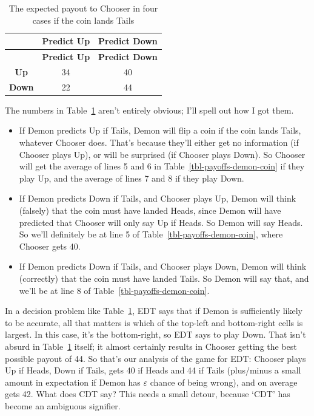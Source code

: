 \documentclass[
  10pt,
  letterpaper,
  DIV=11,
  numbers=noendperiod,
  twoside]{scrartcl}
\providecommand{\tightlist}{%
  \setlength{\itemsep}{0pt}\setlength{\parskip}{0pt}}\usepackage{longtable,booktabs,array}
\begin{document}
\begin{longtable}[]{@{}ccc@{}}
\caption{The expected payout to Chooser in four cases if the coin lands
Tails}\label{tbl-payout-if-tails}\tabularnewline
\toprule\noalign{}
& \textbf{Predict Up} & \textbf{Predict Down} \\
\midrule\noalign{}
\endfirsthead
\toprule\noalign{}
& \textbf{Predict Up} & \textbf{Predict Down} \\
\midrule\noalign{}
\endhead
\bottomrule\noalign{}
\endlastfoot
\textbf{Up} & 34 & 40 \\
\textbf{Down} & 22 & 44 \\
\end{longtable}

The numbers in Table~\ref{tbl-payout-if-tails} aren't entirely obvious;
I'll spell out how I got them.

\begin{itemize}
\tightlist
\item
  If Demon predicts Up if Tails, Demon will flip a coin if the coin
  lands Tails, whatever Chooser does. That's because they'll either get
  no information (if Chooser plays Up), or will be surprised (if Chooser
  plays Down). So Chooser will get the average of lines 5 and 6 in
  Table~\ref{tbl-payoffs-demon-coin} if they play Up, and the average of
  lines 7 and 8 if they play Down.
\item
  If Demon predicts Down if Tails, and Chooser plays Up, Demon will
  think (falsely) that the coin must have landed Heads, since Demon will
  have predicted that Chooser will only say Up if Heads. So Demon will
  say Heads. So we'll definitely be at line 5 of
  Table~\ref{tbl-payoffs-demon-coin}, where Chooser gets 40.
\item
  If Demon predicts Down if Tails, and Chooser plays Down, Demon will
  think (correctly) that the coin must have landed Tails. So Demon will
  say that, and we'll be at line 8 of
  Table~\ref{tbl-payoffs-demon-coin}.
\end{itemize}

In a decision problem like Table~\ref{tbl-payout-if-tails}, EDT says
that if Demon is sufficiently likely to be accurate, all that matters is
which of the top-left and bottom-right cells is largest. In this case,
it's the bottom-right, so EDT says to play Down. That isn't absurd in
Table~\ref{tbl-payout-if-tails} itself; it almost certainly results in
Chooser getting the best possible payout of 44. So that's our analysis
of the game for EDT: Chooser plays Up if Heads, Down if Tails, gets 40
if Heads and 44 if Tails (plus/minus a small amount in expectation if
Demon has \(\varepsilon\) chance of being wrong), and on average gets
42. What does CDT say? This needs a small detour, because `CDT' has
become an ambiguous signifier.
\end{document}
